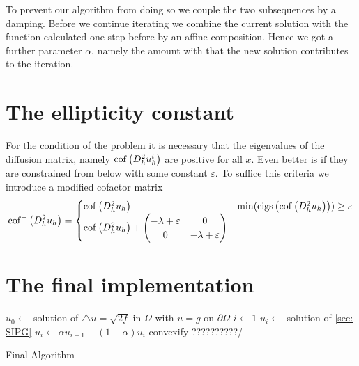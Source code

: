 To prevent our algorithm from doing so we couple the two subsequences by a damping. Before we continue iterating we combine the current solution with the function calculated one step before by an affine composition. Hence we got a further parameter $\alpha$, namely the amount with that the new solution contributes to the iteration.

\section{The ellipticity constant}
For the condition of the problem it is necessary that the eigenvalues of the diffusion matrix, namely $\operatorname{cof} \left( D_h^2 u_h^i \right)$ are positive for all $x$. Even better is if they are constrained from below with some constant $\varepsilon$. 
To suffice this criteria we introduce a modified cofactor matrix
\[ 
	\operatorname{cof}^+ \left( D^2_h u_h \right) = \begin{cases}
	\operatorname{cof} \left( D^2_h u_h \right) & \operatorname{min}( \operatorname{eigs} \left( \operatorname{cof} \left( D^2_h u_h \right) \right)) \geq \varepsilon	\\
	\operatorname{cof} \left( D^2_h u_h \right)+\begin{pmatrix} -\lambda+\varepsilon & 0 \\ 0 & -\lambda+\varepsilon
	\end{pmatrix} 
	\end{cases}
\]

\section{The final implementation}

\begin{algorithm}
\begin{algorithmic}
\State $u_0\gets $ solution of  $
	\triangle u = \sqrt{2f} \text{ in } \Omega $ with $
	u = g \text{ on }\partial \Omega$
\State $i \gets 1$
	\State $u_i \gets$ solution of \ref{sec: SIPG}
	\State $u_i \gets \alpha u_{i-1} + (1-\alpha)u_i $
	\State convexify ??????????/
\EndWhile
\end{algorithmic}
\caption{Final Algorithm}
\end{algorithm}

